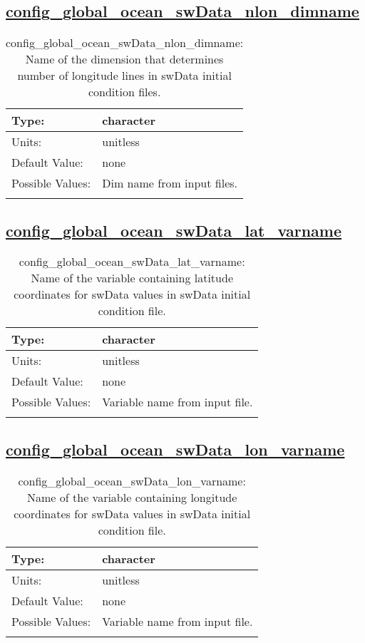 \subsection[config\_global\_ocean\_swData\_nlon\_dimname]{\hyperref[sec:nm_tab_global_ocean]{config\_global\_ocean\_swData\_nlon\_dimname}}
\label{subsec:nm_sec_config_global_ocean_swData_nlon_dimname}
\begin{center}
\begin{longtable}{| p{2.0in} || p{4.0in} |}
    \hline
    Type: & character \\
    \hline
    Units: & \si{unitless} \\
    \hline
    Default Value: & none \\
    \hline
    Possible Values: & Dim name from input files. \\
    \hline
    \caption{config\_global\_ocean\_swData\_nlon\_dimname: Name of the dimension that determines number of longitude lines in swData initial condition files.}
\end{longtable}
\end{center}
\subsection[config\_global\_ocean\_swData\_lat\_varname]{\hyperref[sec:nm_tab_global_ocean]{config\_global\_ocean\_swData\_lat\_varname}}
\label{subsec:nm_sec_config_global_ocean_swData_lat_varname}
\begin{center}
\begin{longtable}{| p{2.0in} || p{4.0in} |}
    \hline
    Type: & character \\
    \hline
    Units: & \si{unitless} \\
    \hline
    Default Value: & none \\
    \hline
    Possible Values: & Variable name from input file. \\
    \hline
    \caption{config\_global\_ocean\_swData\_lat\_varname: Name of the variable containing latitude coordinates for swData values in swData initial condition file.}
\end{longtable}
\end{center}
\subsection[config\_global\_ocean\_swData\_lon\_varname]{\hyperref[sec:nm_tab_global_ocean]{config\_global\_ocean\_swData\_lon\_varname}}
\label{subsec:nm_sec_config_global_ocean_swData_lon_varname}
\begin{center}
\begin{longtable}{| p{2.0in} || p{4.0in} |}
    \hline
    Type: & character \\
    \hline
    Units: & \si{unitless} \\
    \hline
    Default Value: & none \\
    \hline
    Possible Values: & Variable name from input file. \\
    \hline
    \caption{config\_global\_ocean\_swData\_lon\_varname: Name of the variable containing longitude coordinates for swData values in swData initial condition file.}
\end{longtable}
\end{center}
